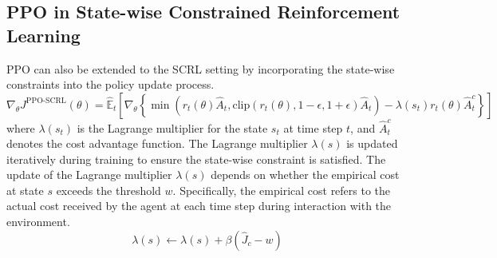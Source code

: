 \subsection{PPO in State-wise Constrained Reinforcement Learning}
PPO can also be extended to the SCRL setting by incorporating the state-wise constraints into the policy update process.
\begin{equation}
  \nabla_\theta J^{\text{PPO-SCRL}}(\theta) = \hat{\mathbb{E}}_t \left[ \nabla_\theta \left\{ \min \left( r_t(\theta)\hat{A}_t, \text{clip}(r_t(\theta), 1 - \epsilon, 1 + \epsilon)\hat{A}_t \right) - \lambda(s_t) r_t(\theta) \hat{A}^c_t \right\} \right]
\end{equation}
where $\lambda(s_t)$ is the Lagrange multiplier for the state $s_t$ at time step $t$, and $\hat{A}^c_t$ denotes the cost advantage function.
The Lagrange multiplier $\lambda(s)$ is updated iteratively during training to ensure the state-wise constraint is satisfied.
The update of the Lagrange multiplier $\lambda(s)$ depends on whether the empirical cost at state $s$ exceeds the threshold $w$.
Specifically, the empirical cost refers to the actual cost received by the agent at each time step during interaction with the environment.
\begin{equation}
  \lambda(s) \leftarrow \lambda(s) + \beta(\hat{J}_c - w)
\end{equation}

